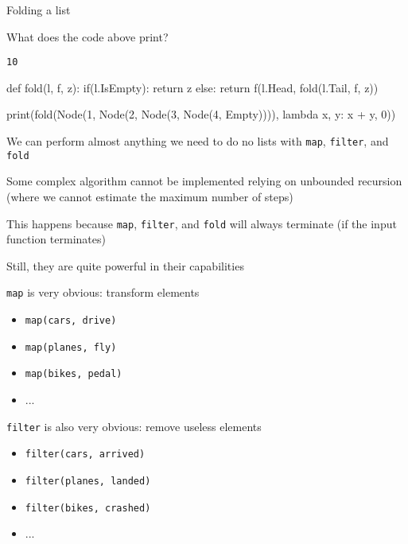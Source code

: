 \documentclass{beamer}
\begin{document}
\begin{frame}[fragile]{Folding a list}
\begin{codewithblock}{\item What does the code above print? \pause \item \texttt{10}}
def fold(l, f, z):
  if(l.IsEmpty):
    return z
  else:
    return f(l.Head, fold(l.Tail, f, z))

print(fold(Node(1, Node(2, Node(3, Node(4, Empty)))), lambda x, y: x + y, 0))
\end{codewithblock}
\end{frame}

\begin{slide}{
\item We can perform almost anything we need to do no lists with \texttt{map}, \texttt{filter}, and \texttt{fold}
\item Some complex algorithm cannot be implemented relying on unbounded recursion (where we cannot estimate the maximum number of steps)
\item This happens because \texttt{map}, \texttt{filter}, and \texttt{fold} will always terminate (if the input function terminates)
\item Still, they are quite powerful in their capabilities
}\end{slide}

\begin{slide}{
\item \texttt{map} is very obvious: transform elements
\begin{itemize}
\item \texttt{map(cars, drive)}
\item \texttt{map(planes, fly)}
\item \texttt{map(bikes, pedal)}
\item ...
\end{itemize}
}\end{slide}

\begin{slide}{
\item \texttt{filter} is also very obvious: remove useless elements
\begin{itemize}
\item \texttt{filter(cars, arrived)}
\item \texttt{filter(planes, landed)}
\item \texttt{filter(bikes, crashed)}
\item ...
\end{itemize}
}\end{slide}
\end{document}
